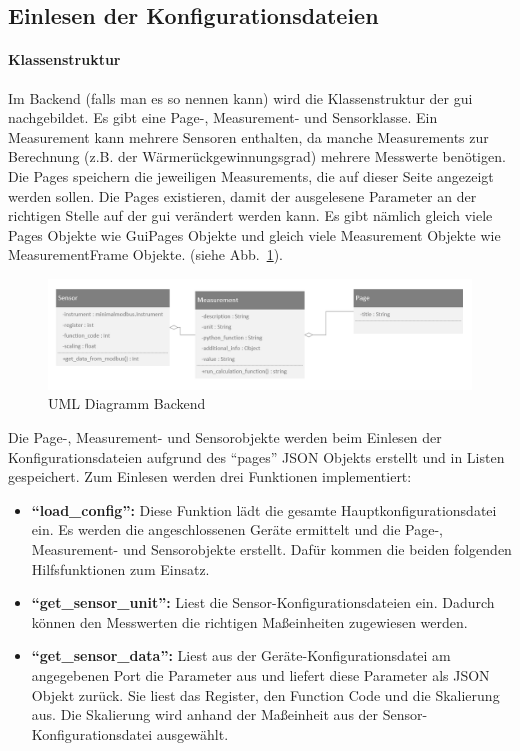 \subsection{Einlesen der Konfigurationsdateien}
\paragraph{Klassenstruktur}
Im Backend (falls man es so nennen kann) wird die Klassenstruktur der \acs{gui} nachgebildet. Es gibt eine Page-, Measurement- und Sensorklasse. Ein Measurement kann mehrere Sensoren enthalten, da manche Measurements zur Berechnung  (z.B. der Wärmerückgewinnungsgrad) mehrere Messwerte benötigen. Die Pages speichern die jeweiligen Measurements, die auf dieser Seite angezeigt werden sollen. Die Pages existieren, damit der ausgelesene Parameter an der richtigen Stelle auf der \acs{gui} verändert werden kann. Es gibt nämlich gleich viele Pages Objekte wie GuiPages Objekte und gleich viele Measurement Objekte wie MeasurementFrame Objekte. (siehe Abb.~\ref{fig:uml_backend}).
\begin{figure}[ht]
	\centering
	\includegraphics[width=1.0\linewidth]{Bilder/UML_Backend}
	\caption{UML Diagramm Backend}
	\label{fig:uml_backend}
\end{figure}

Die Page-, Measurement- und Sensorobjekte werden beim Einlesen der Konfigurationsdateien aufgrund des \enquote{pages} JSON Objekts erstellt und in Listen gespeichert. \newline
Zum Einlesen werden drei Funktionen implementiert:
\begin{itemize}
	\item \textbf{\enquote{load\_config}:} Diese Funktion lädt die gesamte Hauptkonfigurationsdatei ein. Es werden die angeschlossenen Geräte ermittelt und die Page-, Measurement- und Sensorobjekte erstellt. Dafür kommen die beiden folgenden Hilfsfunktionen zum Einsatz.
	\item \textbf{\enquote{get\_sensor\_unit}:} Liest die Sensor-Konfigurationsdateien ein. Dadurch können den Messwerten die richtigen Maßeinheiten zugewiesen werden.
	\item \textbf{\enquote{get\_sensor\_data}:} Liest aus der Geräte-Konfigurationsdatei am angegebenen Port die Parameter aus und liefert diese Parameter als JSON Objekt zurück. Sie liest das Register, den Function Code und die Skalierung aus. Die Skalierung wird anhand der Maßeinheit aus der Sensor-Konfigurationsdatei ausgewählt.
\end{itemize}


